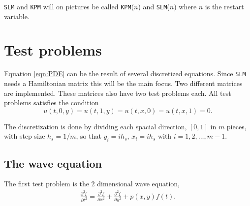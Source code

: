 \noindent \texttt{SLM} and \texttt{KPM} will on pictures be called \texttt{KPM}($n$) and \texttt{SLM}($n$) where $n$ is the restart variable.


\section{Test problems} %
\label{sec:testprob}
Equation \eqref{eqn:PDE} can be the result of several discretized equations. Since \texttt{SLM} needs a Hamiltonian matrix this will be the main focus. Two different matrices are implemented. These matrices also have two test problems each. All test problems satisfies the condition $$u(t,0,y) = u(t,1,y) = u(t,x,0) = u(t,x,1) = 0.$$ 

\noindent The discretization is done by dividing each spacial direction, $[0,1]$ in $m$ pieces, with step size $h_s = 1/m$, so that $y_i = i h_s$, $x_i = i h_s$ with $i = 1,2,\dots,m-1 $. 

\subsection{The wave equation} %
The first test problem is the 2 dimensional wave equation, 
\begin{equation}
\begin{aligned}
\frac{\partial^2 \xi}{\partial t^2} = \frac{\partial^2 \xi}{\partial x^2}+ \frac{\partial^2 \xi}{\partial y^2} + p(x,y)f(t).
\end{aligned}
\label{eqn:wave}
\end{equation}

